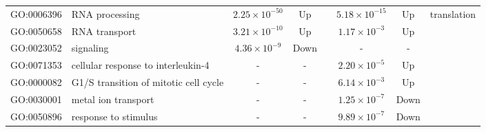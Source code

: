 {\begin{landscape}
\begin{longtable}{cp{3cm}cccccp{5cm}}
    \multicolumn{1}{c}{GO:0006396} & RNA processing & \multicolumn{1}{c}{$2.25\times 10^{-50}$} & \multicolumn{1}{c}{Up} & \multicolumn{1}{c}{} & \multicolumn{1}{c}{$5.18\times 10^{-15}$} & \multicolumn{1}{c}{Up} & translation \\
    \multicolumn{1}{c}{GO:0050658} & RNA transport & \multicolumn{1}{c}{$3.21\times 10^{-10}$} & \multicolumn{1}{c}{Up} & \multicolumn{1}{c}{} & \multicolumn{1}{c}{$1.17\times 10^{-3}$} & \multicolumn{1}{c}{Up} &  \\
    \multicolumn{1}{c}{GO:0023052} & signaling & \multicolumn{1}{c}{$4.36\times 10^{-9}$} & \multicolumn{1}{c}{Down} & \multicolumn{1}{c}{} & \multicolumn{1}{c}{-} & \multicolumn{1}{c}{-} &  \\
    \multicolumn{1}{c}{GO:0071353} & cellular response to interleukin-4 & \multicolumn{1}{c}{-} & \multicolumn{1}{c}{-} & \multicolumn{1}{c}{} & \multicolumn{1}{c}{$2.20\times 10^{-5}$} & \multicolumn{1}{c}{Up} &  \\
    \multicolumn{1}{c}{GO:0000082} & G1/S transition of mitotic cell cycle & \multicolumn{1}{c}{-} & \multicolumn{1}{c}{-} & \multicolumn{1}{c}{} & \multicolumn{1}{c}{$6.14\times 10^{-3}$} & \multicolumn{1}{c}{Up} &  \\
    \multicolumn{1}{c}{GO:0030001} & metal ion transport & \multicolumn{1}{c}{-} & \multicolumn{1}{c}{-} & \multicolumn{1}{c}{} & \multicolumn{1}{c}{$1.25\times 10^{-7}$} & \multicolumn{1}{c}{Down} &  \\
    \multicolumn{1}{c}{GO:0050896} & response to stimulus & \multicolumn{1}{c}{-} & \multicolumn{1}{c}{-} & \multicolumn{1}{c}{} & \multicolumn{1}{c}{$9.89\times 10^{-7}$} & \multicolumn{1}{c}{Down} &  \\
    \bottomrule
    \end{longtable}%
    
\end{landscape}
}